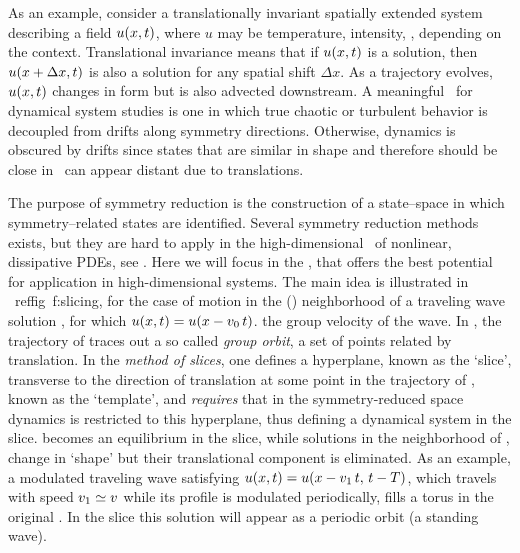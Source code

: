 As an example, consider a translationally invariant spatially extended
system describing a field $u(x,t)$, where $u$ may be temperature,
intensity, \etc, depending on the context. Translational invariance means
that if $u(x,t)$ is a solution, then $u(x+{\Delta x},t)$
is also a solution for any spatial shift ${\Delta x}$.
As a trajectory evolves, $u(x,t)$ changes in form but is also
advected downstream. A meaningful \statesp\ for dynamical system studies
is one in which true chaotic or turbulent behavior is decoupled from
drifts along symmetry directions. Otherwise, dynamics is obscured by
drifts since states that are similar in shape and therefore should be
close in \statesp\, can appear distant due to translations.

The purpose of symmetry reduction is the construction of a state--space
in which symmetry--related states are identified. Several symmetry
reduction methods exists, but they are hard to apply in the
high-dimensional \statesp\ of nonlinear, dissipative PDEs, see
. Here we will focus in the
\mslices{},
that offers the best potential for application in high-dimensional
systems. The main idea is illustrated in ~reffig~{f:slicing}, for the case
of motion in the (\statesp) neighborhood of a traveling wave solution
, for which $u(x,t)=u(x-v_0\,t)$. %
the group velocity of the wave. In \statesp, the trajectory of 
traces out a so called \emph{group orbit}, a set of points related by
translation. In the \emph{method of slices}, one defines a
hyperplane, known as the `slice', transverse to the direction of
translation at some point in the trajectory of , known as the
`template', and \emph{requires} that in the symmetry-reduced space
dynamics is restricted to this hyperplane, thus defining a dynamical
system in the slice.  becomes an equilibrium in the slice,
while solutions in the neighborhood of , change in `shape' but
their translational component is eliminated. As an example, a modulated
traveling wave satisfying $u(x,t)=
u(x-v_1\,t,\,t-T)$, which travels with speed $v_1\simeq v$
while its profile is modulated periodically, fills a torus in the
original \statesp. In the slice this solution will appear as a periodic
orbit (a standing wave).

